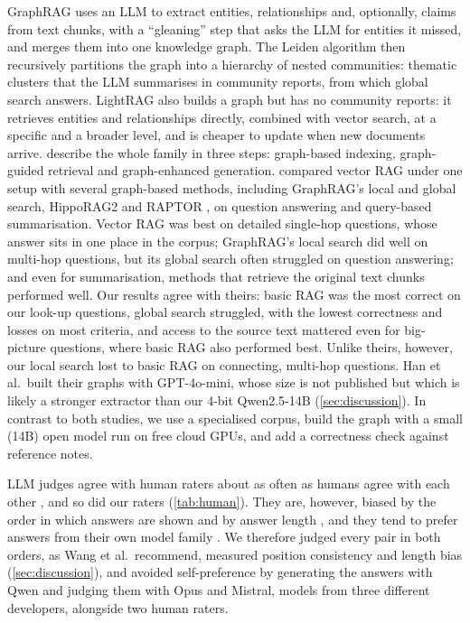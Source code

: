 \documentclass{article}
\begin{document}
GraphRAG \cite{edge2024local} uses an LLM to extract entities, relationships and, optionally, claims
from text chunks, with a ``gleaning'' step that asks the LLM for entities it missed, and merges them
into one knowledge graph. The Leiden algorithm \cite{traag2019leiden} then recursively partitions the
graph into a hierarchy of nested communities: thematic clusters that the LLM summarises in community
reports, from which global search answers.
LightRAG \cite{guo2024lightrag} also builds a graph but has no community reports: it retrieves entities
and relationships directly, combined with vector search, at a specific and a broader level, and is
cheaper to update when new documents arrive. \citet{peng2024graphragsurvey} describe the
whole family in three steps: graph-based indexing, graph-guided retrieval and graph-enhanced
generation.
\citet{han2025ragvsgraphrag} compared vector RAG under one setup with several graph-based
methods, including GraphRAG's local and global search, HippoRAG2 \cite{gutierrez2025hipporag2} and
RAPTOR \cite{sarthi2024raptor}, on question answering and query-based summarisation. Vector RAG was best
on detailed single-hop questions, whose answer sits in one place in the corpus; GraphRAG's local search
did well on multi-hop questions, but its global search often struggled on question answering; and even
for summarisation, methods that retrieve the original text chunks performed well.
Our results agree with theirs: basic RAG was the most correct on our look-up questions, global search
struggled, with the lowest correctness and losses on most criteria, and access to the source text
mattered even for big-picture questions, where basic RAG also performed best. Unlike theirs, however,
our local search lost to basic RAG on connecting, multi-hop questions. Han et al.\ built their graphs with GPT-4o-mini, whose
size is not published but which is likely a stronger extractor than our 4-bit Qwen2.5-14B
(\cref{sec:discussion}). In contrast to both studies, we use a specialised corpus, build the graph with a
small (14B) open model run on free cloud GPUs, and add a correctness check against reference notes.

LLM judges agree with human raters about as often as humans agree with each other
\cite{zheng2023judging}, and so did our raters (\cref{tab:human}). They are, however, biased by the
order in which answers are shown \cite{wang2023fair,han2025ragvsgraphrag} and by answer length
\cite{zheng2023judging,dubois2024length}, and they tend to prefer answers from their own model family
\cite{zheng2023judging}. We therefore judged every pair in both orders, as Wang et al.\ recommend,
measured position consistency and length bias (\cref{sec:discussion}), and avoided self-preference by
generating the answers with Qwen and judging them with Opus and Mistral, models from three different
developers, alongside two human raters.
\end{document}
